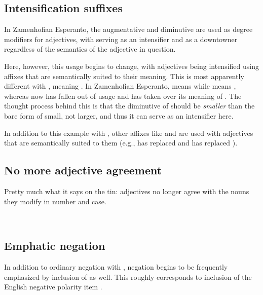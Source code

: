 \subsection{Intensification suffixes}

In Zamenhofian Esperanto, the augmentative  and diminutive  are used as degree modifiers for adjectives, with  serving as an intensifier and  as a downtowner regardless of the semantics of the adjective in question. 

Here, however, this usage begins to change, with adjectives being intensified using affixes that are semantically suited to their meaning. This is most apparently different with , meaning . In Zamenhofian Esperanto,  means  while  means , whereas now  has fallen out of usage and  has taken over its meaning of . The thought process behind this is that the diminutive of  should be \emph{smaller} than the bare form of small, not larger, and thus it can serve as an intensifier here.

In addition to this example with , other affixes like  and  are used with adjectives that are semantically suited to them (e.g.,  has replaced  and  has replaced ).

\subsection{No more adjective agreement}

Pretty much what it says on the tin: adjectives no longer agree with the nouns they modify in number and case. 

\ex
{}\\
\xe

\subsection{Emphatic negation}

In addition to ordinary negation with , negation begins to be frequently emphasized by inclusion of  as well. This roughly corresponds to inclusion of the English negative polarity item .

\ex
{}\\
\xe

